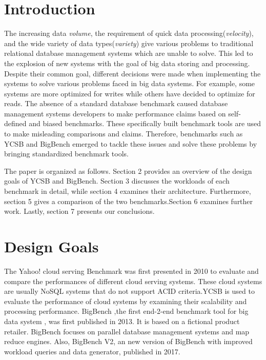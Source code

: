 \documentclass[sigconf,10pt]{acmart}
\begin{document}
\section{Introduction}
The increasing data \emph{volume}, the requirement of quick data processing(\emph{velocity}), and the wide variety of data types(\emph{variety}) give various problems to traditional relational database management systems which are unable to solve. This led to the explosion of new systems with the goal of big data storing and processing. Despite their common goal, different decisions were made when implementing the systems to solve various problems faced in big data systems. For example, some systems are more optimized for writes while others have decided to optimize for reads.
The absence of a standard database benchmark caused database management systems developers to make performance claims based on self-defined and biased benchmarks. These specifically built benchmark tools are used to make misleading comparisons and claims. Therefore, benchmarks such as YCSB\cite{ycsb} and BigBench\cite{bigbench} emerged to tackle these issues and solve these problems by bringing standardized benchmark tools. 

The paper is organized as follows. Section 2 provides an overview of the design goals of YCSB and BigBench. Section 3 discusses the workloads of each benchmark in detail, while section 4 examines their architecture. Furthermore, section 5 gives a  comparison of the two benchmarks.Section 6 examines further work. Lastly, section 7 presents our conclusions.

\newline 

\section{Design Goals}
The Yahoo! cloud serving Benchmark was first presented in 2010 to evaluate and compare the performances of different cloud serving systems. These cloud systems are usually NoSQL systems that do not support ACID criteria.YCSB is used to evaluate the performance of cloud systems by examining their scalability and processing performance.
\newline
\newline
BigBench ,the first end-2-end benchmark tool for big data system , was first published in 2013. It is based on a fictional product retailer. BigBench focuses on parallel database management systems and map reduce engines.
Also, BigBench V2, an new  version of BigBench with improved workload queries and data generator, published in 2017.
\end{document}
